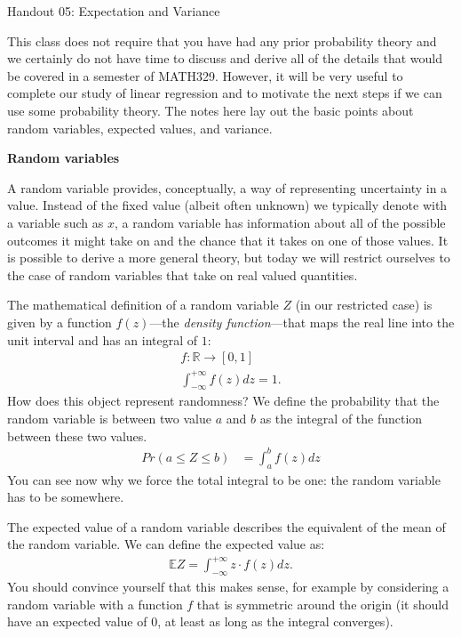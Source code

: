 \documentclass[12pt,hidelinks]{article}
\numberwithin{equation}{section}
\begin{document}
{\LARGE Handout 05: Expectation and Variance}

\vspace*{18pt}

This class does not require that you have had any prior probability theory
and we certainly do not have time to discuss and derive all of the details
that would be covered in a semester of MATH329. However, it will be very
useful to complete our study of linear regression and to motivate the next
steps if we can use some probability theory. The notes here lay out the basic
points about random variables, expected values, and variance.

\textbf{Random variables}

A random variable provides, conceptually, a way of representing uncertainty
in a value. Instead of the fixed value (albeit often unknown) we typically
denote with a variable such as $x$, a random variable has information about
all of the possible outcomes it might take on and the chance that it takes
on one of those values. It is possible to derive a more general theory, but
today we will restrict ourselves to the case of random variables that take on
real valued quantities.

The mathematical definition of a random variable $Z$ (in our restricted case)
is given by a function $f(z)$---the \textit{density function}---that maps the
real line into the unit interval and has an integral of $1$:
\begin{align}
f: \mathbb{R} \rightarrow [0, 1] \\
\int_{-\infty}^{+\infty} f(z) dz = 1.
\end{align}
How does this object represent randomness? We define the probability that the
random variable is between two value $a$ and $b$ as the integral of the function
between these two values.
\begin{align}
Pr(a \leq Z \leq b) &= \int_a^b f(z) dz
\end{align}
You can see now why we force the total integral to be one: the random variable
has to be somewhere.

The expected value of a random variable describes the equivalent of the mean
of the random variable. We can define the expected value as:
\begin{align}
\mathbb{E} Z = \int_{-\infty}^{+\infty} z\cdot f(z) dz.
\end{align}
You should convince yourself that this makes sense, for example by considering
a random variable with a function $f$ that is symmetric around the origin (it
should have an expected value of $0$, at least as long as the integral
converges).
\end{document}
